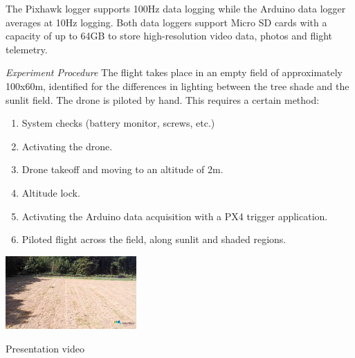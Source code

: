 The Pixhawk logger supports 100Hz data logging while the Arduino data logger averages at 10Hz logging. Both data loggers support Micro SD cards with a capacity of up to 64GB to store high-resolution video data, photos and flight telemetry.


\textit{Experiment Procedure} \hspace {0.3cm} The flight takes place in an empty field of approximately 100x60m, identified for the differences in lighting between the tree shade and the sunlit field. The drone is piloted by hand. This requires a certain method:

\begin{enumerate}
    \item System checks (battery monitor, screws, etc.)
    \item Activating the drone.
    \item Drone takeoff and moving to an altitude of 2m.
    \item Altitude lock.
    \item Activating the Arduino data acquisition with a PX4 trigger application.
    \item Piloted flight across the field, along sunlit and shaded regions.
\end{enumerate}






\begin{marginfigure}%
    \raggedright
    \includegraphics[width=5cm]{images/stage_graphs/environment_results/Flight_Drone.png}
    \caption{Presentation video \cite{fieldscan_video} }
\end{marginfigure}

